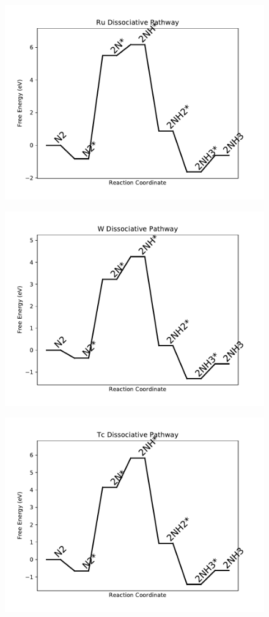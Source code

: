 \begin{figure}
\includegraphics[width=0.8\linewidth]{data/plots/Ru_dissociative.pdf}
\end{figure}

\begin{figure}
\includegraphics[width=0.8\linewidth]{data/plots/W_dissociative.pdf}
\end{figure}

\begin{figure}
\includegraphics[width=0.8\linewidth]{data/plots/Tc_dissociative.pdf}
\end{figure}

